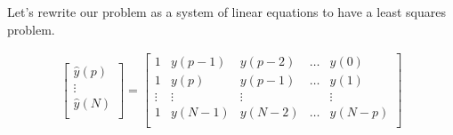 \documentclass[11pt]{article}
\begin{document}
\begin{comment}
We will differenciate this error with respect to the parameters to find the minima. This gives us:


\begin{align*}
f &= \|y-\hat{y} \|_2 = \sum_{t=0}^N (y(t) - \alpha_0 - \sum_{i=1}^p \alpha_iy(t-i))^2\\
\frac{\partial f}{\partial \alpha_0} &= -2 (\sum_{t=0}^N (y(t) - \alpha_0 - \sum_{i=1}^p \alpha_iy(t-i))) = 0\\ 
\frac{\partial f}{\partial \alpha_i} &= -y(t-i) (\sum_{t=0}^N (y(t) - \alpha_0 - \sum_{i=1}^p \alpha_iy(t-i)))=0 \qquad \qquad i = 1\dots p\\ 
\end{align*}
\end{comment}
Let's rewrite our problem as a system of linear equations to have a least squares problem.
\begin{comment}
\begin{align*}
\hat{y}= \begin{bmatrix}
\hat{y}(0)\\
\vdots\\
\hat{y}(N)\\
\end{bmatrix}= \underbrace{\begin{bmatrix}
1 & 0 & 0 &\dots & 0\\
1 & y(0) & 0& \dots &0\\
1 & y(1) & y(0)& \dots &0\\
\vdots&\vdots &\vdots&\ddots&\\
1 & y(p-1)& y(p-2)&\dots& y(0)\\
1 & y(p)&y(p-1)&\dots& y(1)\\
\vdots&\vdots &\vdots&&\vdots\\
1& y(N-1)&y(N-2)&\dots& y(N-p)\\
\end{bmatrix}}_A
\underbrace{\begin{bmatrix}
\alpha_0\\
\vdots\\
\alpha_p\\
\end{bmatrix}}_x\\
\end{align*}
\end{comment}
\begin{align*}
\begin{bmatrix}
\hat{y}(p)\\
\vdots\\
\hat{y}(N)\\
\end{bmatrix}= \begin{bmatrix}
1 & y(p-1)& y(p-2)&\dots& y(0)\\
1 & y(p)&y(p-1)&\dots& y(1)\\
\vdots&\vdots &\vdots&&\vdots\\
1& y(N-1)&y(N-2)&\dots& y(N-p)\\
\end{bmatrix}
\end{align*}
\end{document}
